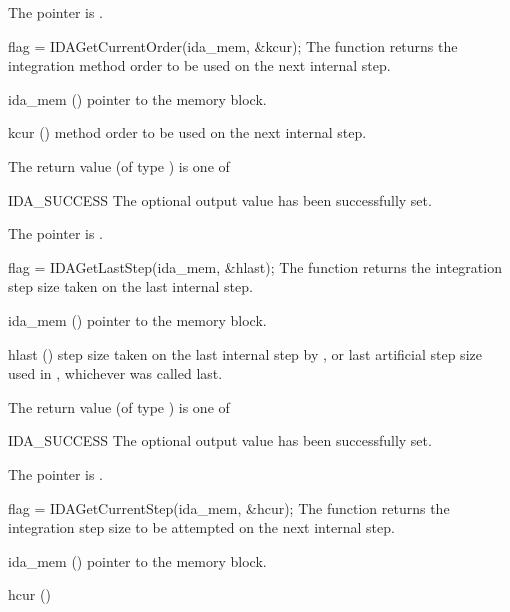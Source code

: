 {{\begin{args}
    The  pointer is .
  \end{args}
}
{}
{
  flag = IDAGetCurrentOrder(ida\_mem, \&kcur);
}
{
  The function  returns the
  integration method order to be used on the next internal step.
}
{
  \begin{args}
  \item[ida\_mem] ()
    pointer to the {\idas} memory block.
  \item[kcur] ()
    method order to be used on the next internal step.
  \end{args}
}
{
  The return value  (of type ) is one of
  \begin{args}
  \item[IDA\_SUCCESS] 
    The optional output value has been successfully set.
  \item[\Id{IDA\_MEM\_NULL}]
    The  pointer is .
  \end{args}
}
{}
{
  flag = IDAGetLastStep(ida\_mem, \&hlast);
}
{
  The function  returns the
  integration step size taken on the last internal step.
}
{
  \begin{args}
  \item[ida\_mem] ()
    pointer to the {\idas} memory block.
  \item[hlast] ()
    step size taken on the last internal step by {\ida}, or last artificial
    step size used in , whichever was called last.
  \end{args}
}
{
  The return value  (of type ) is one of
  \begin{args}
  \item[IDA\_SUCCESS] 
    The optional output value has been successfully set.
  \item[\Id{IDA\_MEM\_NULL}]
    The  pointer is .
  \end{args}
}
{}
{
  flag = IDAGetCurrentStep(ida\_mem, \&hcur);
}
{
  The function  returns the
  integration step size to be attempted on the next internal step.
}
{
  \begin{args}
  \item[ida\_mem] ()
    pointer to the {\idas} memory block.
  \item[hcur] ()

\end{args}}}
